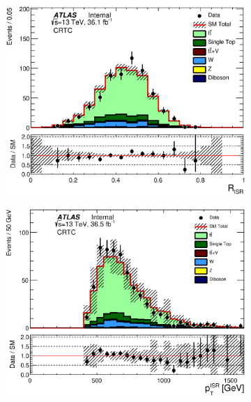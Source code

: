 \begin{figure}[h!]
\begin{center}
  \label{fig:CRTopC1}
    \end{center}
\end{figure}

\pagebreak

\begin{figure}[h!]
  \centering
        \begin{subfigure}[b]{0.40\textwidth}  
    \includegraphics[width=\textwidth]{figures/ttbar/postfit/CA_RISR_CRTopC}
               \caption{ }
    \end{subfigure}
            \begin{subfigure}[b]{0.40\textwidth}  
    \includegraphics[width=\textwidth]{figures/ttbar/postfit/CA_pTISR_CRTopC}

\end{subfigure}
\end{figure}
